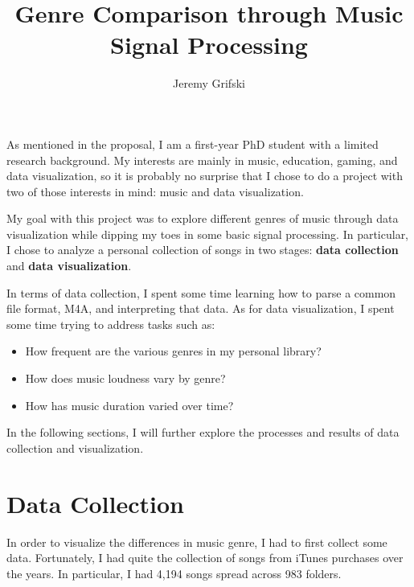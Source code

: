 \documentclass[journal]{vgtc}                %
\title{Genre Comparison through Music Signal Processing}
\author{Jeremy Grifski}
\begin{document}


\maketitle

As mentioned in the proposal, I am a first-year PhD student with a limited
research background. My interests are mainly in music, education, gaming, and
data visualization, so it is probably no surprise that I chose to do a project
with two of those interests in mind: music and data visualization.

My goal with this project was to explore different genres of music through
data visualization while dipping my toes in some basic signal processing.
In particular, I chose to analyze a personal collection of songs in two
stages: \textbf{data collection} and \textbf{data visualization}.

In terms of data collection, I spent some time learning how to parse a common
file format, M4A, and interpreting that data. As for data visualization, I spent
some time trying to address tasks such as:

\begin{itemize}
  \item How frequent are the various genres in my personal library?
  \item How does music loudness vary by genre?
  \item How has music duration varied over time?
\end{itemize}

In the following sections, I will further explore the processes and results of
data collection and visualization.

\section{Data Collection}

In order to visualize the differences in music genre, I had to first collect
some data. Fortunately, I had quite the collection of songs from iTunes purchases
over the years. In particular, I had 4,194 songs spread across 983 folders.
\end{document}
